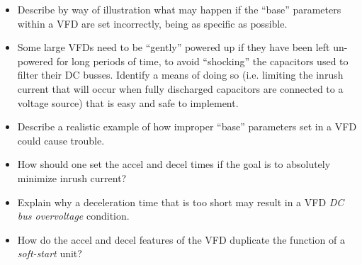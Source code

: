 \begin{itemize}
\item{}  Describe by way of illustration what may happen if the ``base'' parameters within a VFD are set incorrectly, being as specific as possible.
\item{} Some large VFDs need to be ``gently'' powered up if they have been left un-powered for long periods of time, to avoid ``shocking'' the capacitors used to filter their DC busses.  Identify a means of doing so (i.e. limiting the inrush current that will occur when fully discharged capacitors are connected to a voltage source) that is easy and safe to implement.
\item{} Describe a realistic example of how improper ``base'' parameters set in a VFD could cause trouble.
\item{} How should one set the accel and decel times if the goal is to absolutely minimize inrush current?
\item{} Explain why a deceleration time that is too short may result in a VFD {\it DC bus overvoltage} condition.
\item{} How do the accel and decel features of the VFD duplicate the function of a {\it soft-start} unit?
\end{itemize}


















